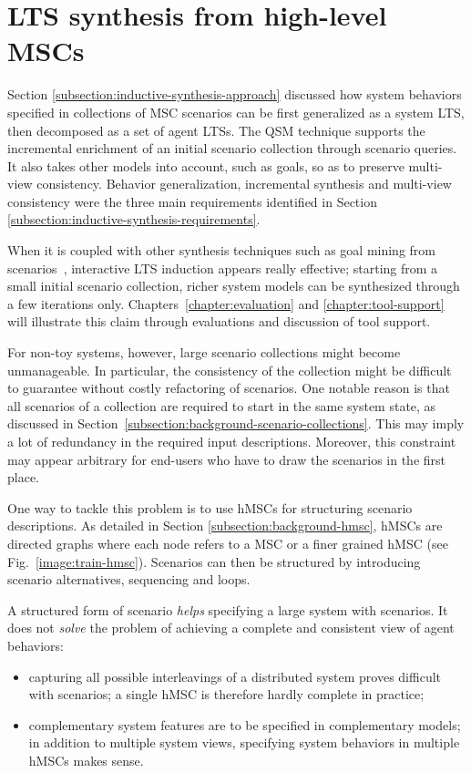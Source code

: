 \section{LTS synthesis from high-level MSCs\label{section:inductive-from-hMSC}}

Section \ref{subsection:inductive-synthesis-approach} discussed how system behaviors specified in collections of MSC scenarios can be first generalized as a system LTS, then decomposed as a set of agent LTSs. The QSM technique supports the incremental enrichment of an initial scenario collection through scenario queries. It also takes other models into account, such as goals, so as to preserve multi-view consistency. Behavior generalization, incremental synthesis and multi-view consistency were the three main requirements identified in Section \ref{subsection:inductive-synthesis-requirements}. 

When it is coupled with other synthesis techniques such as goal mining from scenarios~\cite{Damas:2006}, interactive LTS induction appears really effective; starting from a small initial scenario collection, richer system models can be synthesized through a few iterations only. Chapters~\ref{chapter:evaluation} and \ref{chapter:tool-support} will illustrate this claim through evaluations and discussion of tool support.

For non-toy systems, however, large scenario collections might become unmanageable. In particular, the consistency of the collection might be difficult to guarantee without costly refactoring of scenarios. One notable reason is that all scenarios of a collection are required to start in the same system state, as discussed in Section~\ref{subsection:background-scenario-collections}. This may imply a lot of redundancy in the required input descriptions. Moreover, this constraint may appear arbitrary for end-users who have to draw the scenarios in the first place.

One way to tackle this problem is to use hMSCs for structuring scenario descriptions. As detailed in Section \ref{subsection:background-hmsc}, hMSCs are directed graphs where each node refers to a MSC or a finer grained hMSC (see Fig.~\ref{image:train-hmsc}). Scenarios can then be structured by introducing scenario alternatives, sequencing and loops.

A structured form of scenario \emph{helps} specifying a large system with scenarios. It does not \emph{solve} the problem of achieving a complete and consistent view of agent behaviors:
\begin{itemize}
\item capturing all possible interleavings of a distributed system proves difficult with scenarios; a single hMSC is therefore hardly complete in practice;
\item complementary system features are to be specified in complementary models; in addition to multiple system views, specifying system behaviors in multiple hMSCs makes sense.
\end{itemize}

